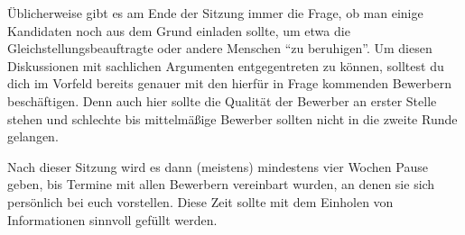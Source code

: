 Üblicherweise gibt es am Ende der Sitzung immer die Frage, ob man einige Kandidaten noch aus dem Grund einladen sollte, um etwa die Gleichstellungsbeauftragte oder andere Menschen "`zu beruhigen"'. Um diesen Diskussionen mit sachlichen Argumenten entgegentreten zu können, solltest du dich im Vorfeld bereits genauer mit den hierfür in Frage kommenden Bewerbern beschäftigen. Denn auch hier sollte die Qualität der Bewerber an erster Stelle stehen und schlechte bis mittelmäßige Bewerber sollten nicht in die zweite Runde gelangen.

Nach dieser Sitzung wird es dann (meistens) mindestens vier Wochen Pause geben, bis Termine mit allen Bewerbern vereinbart wurden, an denen sie sich persönlich bei euch vorstellen. Diese Zeit sollte mit dem Einholen von Informationen sinnvoll gefüllt werden.

